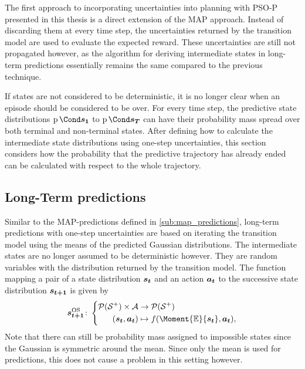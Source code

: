 The first approach to incorporating uncertainties into planning with PSO-P presented in this thesis is a direct extension of the MAP approach.
Instead of discarding them at every time step, the uncertainties returned by the transition model are used to evaluate the expected reward.
These uncertainties are still not propagated however, as the algorithm for deriving intermediate states in long-term predictions essentially remains the same compared to the previous technique.

If states are not considered to be deterministic, it is no longer clear when an episode should be considered to be over.
For every time step, the predictive state distributions $\Prob{\mat{s_1}}$ to $\Prob{\mat{s_T}}$ can have their probability mass spread over both terminal and non-terminal states.
After defining how to calculate the intermediate state distributions using one-step uncertainties, this section considers how the probability that the predictive trajectory has already ended can be calculated with respect to the whole trajectory.

\subsection{Long-Term predictions}
\label{sub:os_predictions}
Similar to the MAP-predictions defined in \cref{sub:map_predictions}, long-term predictions with one-step uncertainties are based on iterating the transition model using the means of the predicted Gaussian distributions.
The intermediate states are no longer assumed to be deterministic however.
They are random variables with the distribution returned by the transition model.
The function mapping a pair of a state distribution $\bm{s_t}$ and an action $\bm{a_t}$ to the successive state distribution $\bm{s_{t+1}}$ is given by
\begin{align}
    \label{eq:os_dynamic_programming}
    \os{\mat{s_{t+1}}} \colon \left\{
        \begin{aligned}
            \Dists(\Es^+) \times \Ah &\to \Dists(\Es^+) \\
            (\rv{s_t}, \mat{a_t}) &\mapsto f(\Moment{\E}{\rv{s_t}}, \mat{a_t}),
    \end{aligned}
    \right.
\end{align}
Note that there can still be probability mass assigned to impossible states since the Gaussian is symmetric around the mean.
Since only the mean is used for predictions, this does not cause a problem in this setting however.

